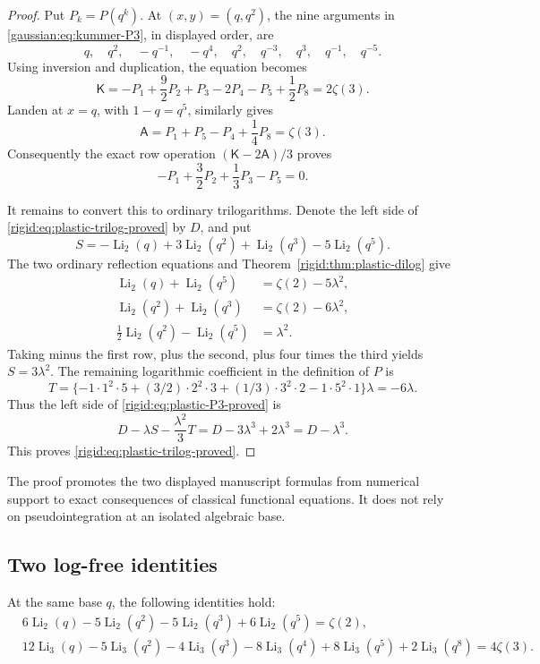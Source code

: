 \begin{proof}
Put $P_k=P(q^k)$.  At $(x,y)=(q,q^2)$, the nine arguments in
\eqref{gaussian:eq:kummer-P3}, in displayed order, are
\[
q,\quad q^2,\quad -q^{-1},\quad -q^4,\quad q^2,
\quad q^{-3},\quad q^3,\quad q^{-1},\quad q^{-5}.
\]
Using inversion and duplication, the equation becomes
\[
\mathsf K=-P_1+\frac92P_2+P_3-2P_4-P_5+\frac12P_8
=2\zeta(3).
\]
Landen at $x=q$, with $1-q=q^5$, similarly gives
\[
\mathsf A=P_1+P_5-P_4+\frac14P_8=\zeta(3).
\]
Consequently the exact row operation $(\mathsf K-2\mathsf A)/3$
proves
\begin{equation}
-P_1+\frac32P_2+\frac13P_3-P_5=0.
\label{rigid:eq:plastic-P3-proved}
\end{equation}

It remains to convert this to ordinary trilogarithms.  Denote the
left side of \eqref{rigid:eq:plastic-trilog-proved} by $D$, and put
\[
S=-\operatorname{Li}_2(q)+3\operatorname{Li}_2(q^2)
 +\operatorname{Li}_2(q^3)-5\operatorname{Li}_2(q^5).
\]
The two ordinary reflection equations and
Theorem~\ref{rigid:thm:plastic-dilog} give
\begin{align*}
\operatorname{Li}_2(q)+\operatorname{Li}_2(q^5)
 &=\zeta(2)-5\lambda^2,\\
\operatorname{Li}_2(q^2)+\operatorname{Li}_2(q^3)
 &=\zeta(2)-6\lambda^2,\\
\tfrac12\operatorname{Li}_2(q^2)-\operatorname{Li}_2(q^5)
 &=\lambda^2.
\end{align*}
Taking minus the first row, plus the second, plus four times the
third yields $S=3\lambda^2$.
The remaining logarithmic coefficient in the definition of $P$ is
\[
T=\{-1\cdot1^2\cdot5
 +(3/2)\cdot2^2\cdot3
 +(1/3)\cdot3^2\cdot2
 -1\cdot5^2\cdot1\}\lambda=-6\lambda.
\]
Thus the left side of \eqref{rigid:eq:plastic-P3-proved} is
\[
D-\lambda S-\frac{\lambda^2}{3}T
=D-3\lambda^3+2\lambda^3=D-\lambda^3.
\]
This proves \eqref{rigid:eq:plastic-trilog-proved}.
\end{proof}

The proof promotes the two displayed manuscript formulas from
numerical support to exact consequences of classical functional
equations.  It does not rely on pseudointegration at an isolated
algebraic base.

\subsection{Two log-free identities}

\begin{theorem}
\label{rigid:thm:plastic-logfree}
At the same base $q$, the following identities hold:
\begin{align}
&6\operatorname{Li}_2(q)-5\operatorname{Li}_2(q^2)
 -5\operatorname{Li}_2(q^3)+6\operatorname{Li}_2(q^5)
 =\zeta(2),\label{rigid:eq:plastic-logfree2}\\
&12\operatorname{Li}_3(q)-5\operatorname{Li}_3(q^2)
 -4\operatorname{Li}_3(q^3)-8\operatorname{Li}_3(q^4)
 +8\operatorname{Li}_3(q^5)+2\operatorname{Li}_3(q^8)
 =4\zeta(3).
\label{rigid:eq:plastic-logfree3}
\end{align}
\end{theorem}

